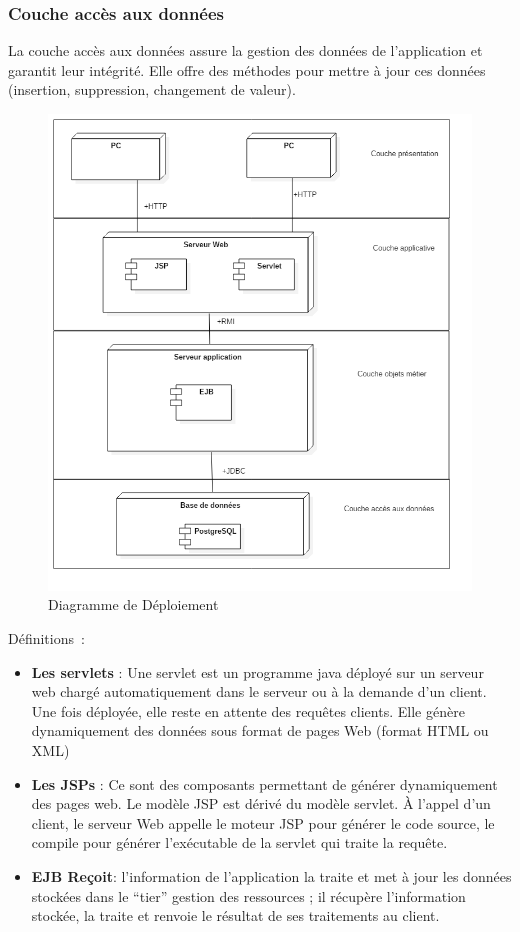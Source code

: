 \documentclass[a4paper, titlepage]{report}
\let\oldparagraph\subsubsection
\renewcommand{\subsubsection}[1]{\oldparagraph{#1}\mbox{}}
\begin{document}
\subsubsection{Couche accès aux données}\label{couche-acces-donnees}

La couche accès aux données assure la gestion des données de
l'application et garantit leur intégrité. Elle offre des méthodes pour
mettre à jour ces données (insertion, suppression, changement de
valeur).

\clearpage
\begin{figure}[!hp]
\centering
\includegraphics{Images/Architecture.png}
\caption{Diagramme de Déploiement}
\end{figure}

Définitions~: 
\begin{itemize}
\item \textbf{Les servlets} : Une servlet est un programme java déployé
sur un serveur web chargé automatiquement dans le serveur ou à la
demande d'un client. Une fois déployée, elle reste en attente des
requêtes clients. Elle génère dynamiquement des données sous format de
pages Web (format HTML ou XML)
\item \textbf{Les JSPs} : Ce sont des composants permettant de générer dynamiquement des pages web. Le modèle JSP est dérivé du modèle servlet. À l'appel d'un client, le serveur Web appelle le moteur JSP pour générer le code source, le compile pour générer l'exécutable de la servlet qui traite la requête.
\item \textbf{EJB Reçoit}: l'information de l'application la traite et met à jour les données stockées dans le ``tier'' gestion des ressources ; il récupère l'information stockée, la traite et renvoie le résultat de ses
traitements au client.
\end{itemize}
\end{document}
